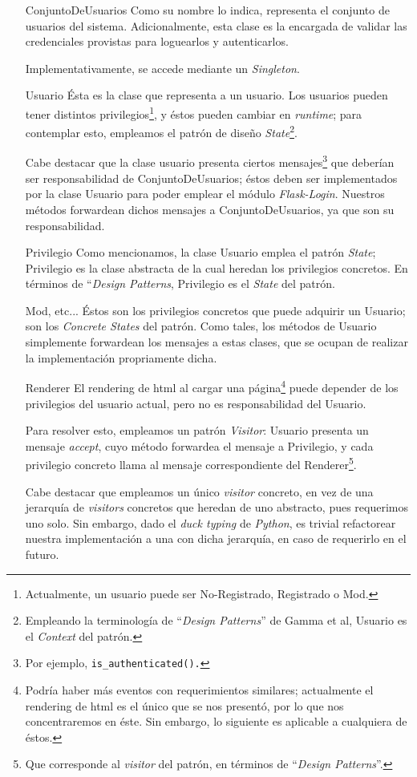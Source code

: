 \begin{itemize}
\item[ConjuntoDeUsuarios] Como su nombre lo indica, representa el conjunto de usuarios del sistema. Adicionalmente, esta clase es la encargada de validar las credenciales provistas para loguearlos y autenticarlos.
    \par Implementativamente, se accede mediante un \textit{Singleton}.
\item[Usuario] Ésta es la clase que representa a un usuario. 
    Los usuarios pueden tener distintos privilegios\footnote{Actualmente, un usuario puede ser No-Registrado, Registrado o Mod.}, y éstos pueden cambiar en \textit{runtime}; para contemplar esto, empleamos el patrón de diseño \textit{State}\footnote{Empleando la terminología de ``\textit{Design Patterns}'' de Gamma et al, Usuario es el \textit{Context} del patrón.}.
        \par Cabe destacar que la clase usuario presenta ciertos mensajes\footnote{Por ejemplo, \tt{is\_authenticated()}.} que deberían ser responsabilidad de ConjuntoDeUsuarios; éstos deben ser implementados por la clase Usuario para poder emplear el módulo \textit{Flask-Login}.
        Nuestros métodos forwardean dichos mensajes a ConjuntoDeUsuarios, ya que son su responsabilidad.
    \item[Privilegio] Como mencionamos, la clase Usuario emplea el patrón \textit{State}; Privilegio es la clase abstracta de la cual heredan los privilegios concretos. En términos de ``\textit{Design Patterns}, Privilegio es el \textit{State} del patrón.
    \item[Mod, etc...] Éstos son los privilegios concretos que puede adquirir un Usuario; son los \textit{Concrete States} del patrón. Como tales, los métodos de Usuario simplemente forwardean los mensajes a estas clases, que se ocupan de realizar la implementación propriamente dicha.
    \item[Renderer] El rendering de html al cargar una página\footnote{Podría haber más eventos con requerimientos similares; actualmente el rendering de html es el único que se nos presentó, por lo que nos concentraremos en éste. Sin embargo, lo siguiente es aplicable a cualquiera de éstos.} puede depender de los privilegios del usuario actual, pero no es responsabilidad del Usuario.
        \par Para resolver esto, empleamos un patrón \textit{Visitor}: Usuario presenta un mensaje \textit{accept}, cuyo método forwardea el mensaje a Privilegio, y cada privilegio concreto llama al mensaje correspondiente del Renderer\footnote{Que corresponde al \textit{visitor} del patrón, en términos de ``\textit{Design Patterns}''.}.
    \par Cabe destacar que empleamos un único \textit{visitor} concreto, en vez de una jerarquía de \textit{visitors} concretos que heredan de uno abstracto, pues requerimos uno solo. Sin embargo, dado el \textit{duck typing} de \textit{Python}, es trivial refactorear nuestra implementación a una con dicha jerarquía, en caso de requerirlo en el futuro.
\end{itemize}



